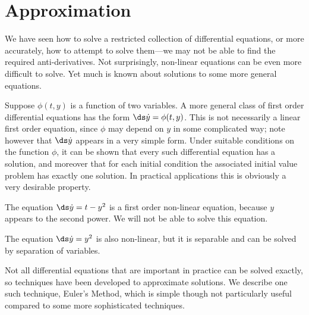\section{Approximation}{}{}
\nobreak
We have seen how to solve a restricted collection of differential
equations, or more  accurately, how to attempt to solve them---we may
not be able to find the required anti-derivatives. Not surprisingly,
non-linear equations can be even more difficult to solve. Yet much is
known about solutions to some more general equations.

Suppose $\phi(t,y)$ is a function of two variables. A more general
class of first order differential equations has the form $\ds\dot
y=\phi(t,y)$. This is not necessarily a linear first order equation,
since $\phi$ may depend on $y$ in some complicated way; note however
that $\ds\dot y$ appears in a very simple form. Under suitable
conditions on the function $\phi$, it can be shown that every such
differential equation has a solution, and moreover that for each
initial condition the associated initial value problem has exactly one
solution. In practical applications this is obviously a very desirable
property. 

\begin{example} The equation $\ds\dot y=t-y^2$ is a first order non-linear
equation, because $y$ appears to the second power. We will not be able
to solve this equation.
\end{example}

\begin{example} The equation $\ds\dot y=y^2$ is also non-linear, but it is
separable and can be solved by separation of variables.
\end{example}

Not all differential equations that are important in practice can be
solved exactly, so techniques have been developed to approximate
solutions. We describe one such technique, {\dfont Euler's
  Method}, which is simple though not particularly
useful compared to some more sophisticated techniques.

